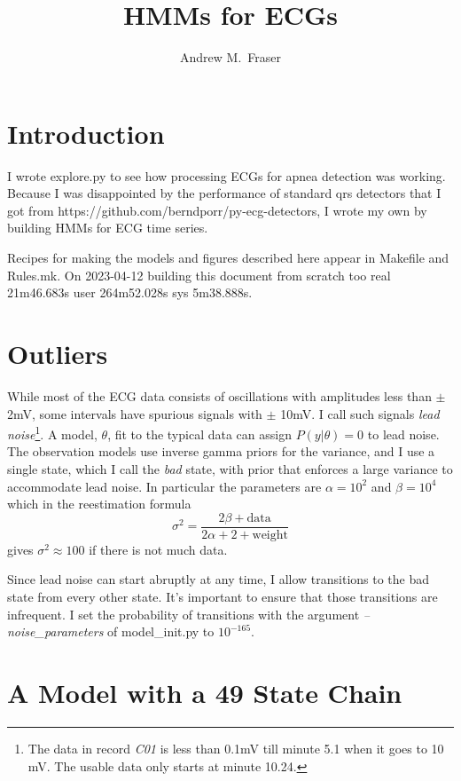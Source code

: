 \documentclass[12pt]{article}
\title{HMMs for ECGs}
\author{Andrew M.\ Fraser}
\begin{document}
\maketitle

\section{Introduction}
\label{sec:introduction}

I wrote explore.py to see how processing ECGs for apnea detection was
working.  Because I was disappointed by the performance of standard qrs
detectors that I got from
https://github.com/berndporr/py-ecg-detectors, I wrote my own by
building HMMs for ECG time series.

Recipes for making the models and figures described here appear in
Makefile and Rules.mk.  On 2023-04-12 building this document from
scratch too real 21m46.683s user 264m52.028s sys 5m38.888s.

\section{Outliers}
\label{sec:outliers}

While most of the ECG data consists of oscillations with amplitudes
less than $\pm$ 2mV, some intervals have spurious signals with $\pm$
10mV.  I call such signals \emph{lead noise}\footnote{The data in
  record \emph{C01} is less than 0.1mV till minute 5.1 when it goes to
  10 mV.  The usable data only starts at minute 10.24.}.  A model,
$\theta$, fit to the typical data can assign $P(y|\theta) = 0$ to lead
noise.  The observation models use inverse gamma priors for the
variance, and I use a single state, which I call the \emph{bad} state,
with prior that enforces a large variance to accommodate lead noise.
In particular the parameters are $\alpha=10^{2}$ and $\beta=10^{4}$
which in the reestimation formula
\begin{equation*}
  \sigma^2 = \frac{2 \beta + \text{data}}{2 \alpha +2 + \text{weight}}
\end{equation*}
gives $\sigma^2 \approx 100$ if there is not much data.

Since lead noise can start abruptly at any time, I allow transitions
to the bad state from every other state.  It's important to ensure
that those transitions are infrequent.  I set the probability of
transitions with the argument \emph{--noise\_parameters} of
model\_init.py to $10^{-165}$.

\section{A Model with a 49 State Chain}
\label{sec:mono20}
\end{document}
